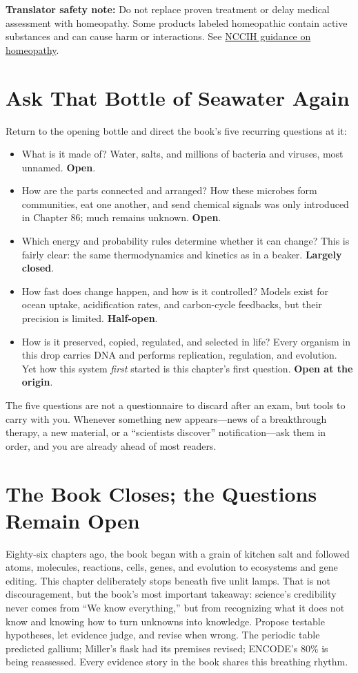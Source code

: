 \textbf{Translator safety note:} Do not replace proven treatment or delay medical assessment with homeopathy. Some products labeled homeopathic contain active substances and can cause harm or interactions. See \href{https://www.nccih.nih.gov/health/homeopathy}{NCCIH guidance on homeopathy}.

\section{Ask That Bottle of Seawater Again}

Return to the opening bottle and direct the book's five recurring questions at it:

\begin{itemize}[itemsep=2pt]
\item What is it made of? Water, salts, and millions of bacteria and viruses, most unnamed. \textbf{Open}.
\item How are the parts connected and arranged? How these microbes form communities, eat one another, and send chemical signals was only introduced in Chapter 86; much remains unknown. \textbf{Open}.
\item Which energy and probability rules determine whether it can change? This is fairly clear: the same thermodynamics and kinetics as in a beaker. \textbf{Largely closed}.
\item How fast does change happen, and how is it controlled? Models exist for ocean  uptake, acidification rates, and carbon-cycle feedbacks, but their precision is limited. \textbf{Half-open}.
\item How is it preserved, copied, regulated, and selected in life? Every organism in this drop carries DNA and performs replication, regulation, and evolution. Yet how this system \emph{first} started is this chapter's first question. \textbf{Open at the origin}.
\end{itemize}

The five questions are not a questionnaire to discard after an exam, but tools to carry with you. Whenever something new appears---news of a breakthrough therapy, a new material, or a ``scientists discover'' notification---ask them in order, and you are already ahead of most readers.

\section{The Book Closes; the Questions Remain Open}

Eighty-six chapters ago, the book began with a grain of kitchen salt and followed atoms, molecules, reactions, cells, genes, and evolution to ecosystems and gene editing. This chapter deliberately stops beneath five unlit lamps. That is not discouragement, but the book's most important takeaway: science's credibility never comes from ``We know everything,'' but from recognizing what it does not know and knowing how to turn unknowns into knowledge. Propose testable hypotheses, let evidence judge, and revise when wrong. The periodic table predicted gallium; Miller's flask had its premises revised; ENCODE's 80\% is being reassessed. Every evidence story in the book shares this breathing rhythm.

